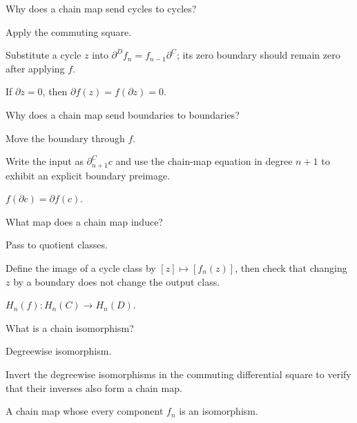 \begin{exercise}\label{exr:viii16-12}
Why does a chain map send cycles to cycles?
\end{exercise}
\begin{hint}
Apply the commuting square.

Substitute a cycle \(z\) into \(\partial^D f_n=f_{n-1}\partial^C\); its zero boundary should remain zero after applying \(f\).
\end{hint}
\begin{solution}
If \(\partial z=0\), then \(\partial f(z)=f(\partial z)=0\).
\end{solution}

\begin{exercise}\label{exr:viii16-13}
Why does a chain map send boundaries to boundaries?
\end{exercise}
\begin{hint}
Move the boundary through \(f\).

Write the input as \(\partial^C_{n+1}c\) and use the chain-map equation in degree \(n+1\) to exhibit an explicit boundary preimage.
\end{hint}
\begin{solution}
\(f(\partial c)=\partial f(c)\).
\end{solution}

\begin{exercise}\label{exr:viii16-14}
What map does a chain map induce?
\end{exercise}
\begin{hint}
Pass to quotient classes.

Define the image of a cycle class by \([z]\mapsto[f_n(z)]\), then check that changing \(z\) by a boundary does not change the output class.
\end{hint}
\begin{solution}
\(H_n(f):H_n(C)\to H_n(D)\).
\end{solution}

\begin{exercise}\label{exr:viii16-15}
What is a chain isomorphism?
\end{exercise}
\begin{hint}
Degreewise isomorphism.

Invert the degreewise isomorphisms in the commuting differential square to verify that their inverses also form a chain map.
\end{hint}
\begin{solution}
A chain map whose every component \(f_n\) is an isomorphism.
\end{solution}

